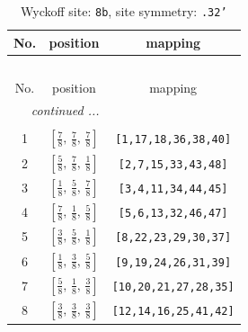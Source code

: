 \documentclass[fleqn,8pt]{jsarticle}
\begin{document}
\begin{longtable}{ccc}
\caption{Wyckoff site: {\tt 8b}, site symmetry: {\tt .32'}}
 \\
 \hline \hline
No. & position & mapping \\ \hline \endfirsthead

\multicolumn{2}{l}{\tablename\ \thetable{}} \\
 \hline \hline
No. & position & mapping \\ \hline \endhead

 \hline \hline
\multicolumn{2}{r}{\footnotesize\it continued ...} \\ \endfoot

 \hline \hline
\multicolumn{2}{r}{} \\ \endlastfoot

1 & $\left[ \frac{7}{8},\, \frac{7}{8},\, \frac{7}{8} \right]$ & {\tt [1,17,18,36,38,40]} \\ \hline
2 & $\left[ \frac{5}{8},\, \frac{7}{8},\, \frac{1}{8} \right]$ & {\tt [2,7,15,33,43,48]} \\ \hline
3 & $\left[ \frac{1}{8},\, \frac{5}{8},\, \frac{7}{8} \right]$ & {\tt [3,4,11,34,44,45]} \\ \hline
4 & $\left[ \frac{7}{8},\, \frac{1}{8},\, \frac{5}{8} \right]$ & {\tt [5,6,13,32,46,47]} \\ \hline
5 & $\left[ \frac{3}{8},\, \frac{5}{8},\, \frac{1}{8} \right]$ & {\tt [8,22,23,29,30,37]} \\ \hline
6 & $\left[ \frac{1}{8},\, \frac{3}{8},\, \frac{5}{8} \right]$ & {\tt [9,19,24,26,31,39]} \\ \hline
7 & $\left[ \frac{5}{8},\, \frac{1}{8},\, \frac{3}{8} \right]$ & {\tt [10,20,21,27,28,35]} \\ \hline
8 & $\left[ \frac{3}{8},\, \frac{3}{8},\, \frac{3}{8} \right]$ & {\tt [12,14,16,25,41,42]} \\
\end{longtable}
\renewcommand{\arraystretch}{1.2}
\end{document}
